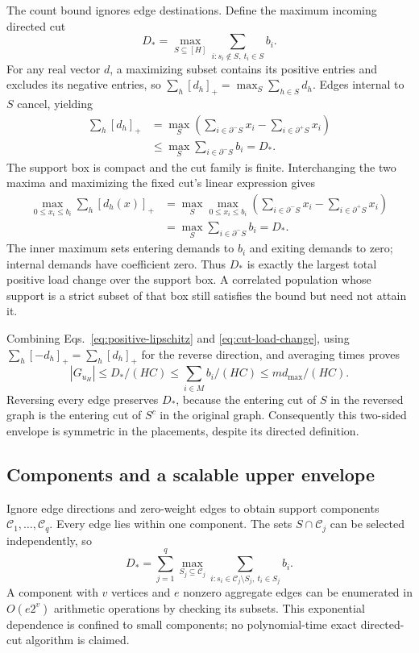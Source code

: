 \documentclass[11pt]{article}
\begin{document}
The count bound ignores edge destinations. Define the maximum incoming directed cut
\begin{equation}
 D_*=\max_{S\subseteq[H]}\sum_{i:s_i\notin S,\ t_i\in S}b_i.
 \label{eq:directed-cut}
\end{equation}
For any real vector $d$, a maximizing subset contains its positive entries and excludes its negative entries, so $\sum_h[d_h]_+=\max_S\sum_{h\in S}d_h$. Edges internal to $S$ cancel, yielding
\begin{align}
 \sum_h[d_h]_+&=\max_S\left(\sum_{i\in\partial^-S}x_i-\sum_{i\in\partial^+S}x_i\right)\\
 &\le\max_S\sum_{i\in\partial^-S}b_i=D_*.
 \label{eq:cut-load-change}
\end{align}
The support box is compact and the cut family is finite. Interchanging the two maxima and maximizing the fixed cut's linear expression gives
\begin{align}
 \max_{0\le x_i\le b_i}\sum_h[d_h(x)]_+
 &=\max_S\max_{0\le x_i\le b_i}\left(\sum_{i\in\partial^-S}x_i-\sum_{i\in\partial^+S}x_i\right)\\
 &=\max_S\sum_{i\in\partial^-S}b_i=D_*.
\end{align}
The inner maximum sets entering demands to $b_i$ and exiting demands to zero; internal demands have coefficient zero. Thus $D_*$ is exactly the largest total positive load change over the support box. A correlated population whose support is a strict subset of that box still satisfies the bound but need not attain it.

Combining Eqs.~\eqref{eq:positive-lipschitz} and \eqref{eq:cut-load-change}, using $\sum_h[-d_h]_+=\sum_h[d_h]_+$ for the reverse direction, and averaging times proves
\begin{equation}
 |G_{u_H}|\le D_*/(HC)\le\sum_{i\in M}b_i/(HC)\le m d_{\max}/(HC).
 \label{eq:graph-raw}
\end{equation}
Reversing every edge preserves $D_*$, because the entering cut of $S$ in the reversed graph is the entering cut of $S^c$ in the original graph. Consequently this two-sided envelope is symmetric in the placements, despite its directed definition.

\subsection{Components and a scalable upper envelope}
Ignore edge directions and zero-weight edges to obtain support components $\mathcal C_1,\ldots,\mathcal C_q$. Every edge lies within one component. The sets $S\cap\mathcal C_j$ can be selected independently, so
\begin{equation}
 D_*=\sum_{j=1}^q\max_{S_j\subseteq\mathcal C_j}\sum_{i:s_i\in\mathcal C_j\setminus S_j,\ t_i\in S_j}b_i.
\end{equation}
A component with $v$ vertices and $e$ nonzero aggregate edges can be enumerated in $O(e2^v)$ arithmetic operations by checking its subsets. This exponential dependence is confined to small components; no polynomial-time exact directed-cut algorithm is claimed.
\end{document}
